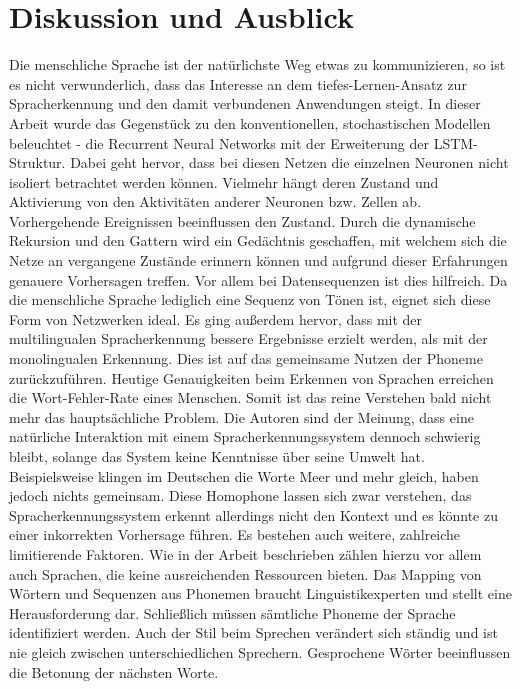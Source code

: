 \section{Diskussion und Ausblick}
Die menschliche Sprache ist der natürlichste Weg etwas zu kommunizieren, so ist es nicht verwunderlich, dass das Interesse an dem tiefes-Lernen-Ansatz zur Spracherkennung und den damit verbundenen Anwendungen steigt. In dieser Arbeit wurde das Gegenstück zu den konventionellen, stochastischen Modellen beleuchtet - die Recurrent Neural Networks mit der Erweiterung der LSTM-Struktur. Dabei geht hervor, dass bei diesen Netzen die einzelnen Neuronen nicht isoliert betrachtet werden können. Vielmehr hängt deren Zustand und Aktivierung von den Aktivitäten anderer Neuronen bzw. Zellen ab. Vorhergehende Ereignissen beeinflussen den Zustand. Durch die dynamische Rekursion und den Gattern wird ein Gedächtnis geschaffen, mit welchem sich die Netze an vergangene Zustände erinnern können und aufgrund dieser Erfahrungen genauere Vorhersagen treffen. Vor allem bei Datensequenzen ist dies hilfreich. Da die menschliche Sprache lediglich eine Sequenz von Tönen ist, eignet sich diese Form von Netzwerken ideal. Es ging außerdem hervor, dass mit der multilingualen Spracherkennung bessere Ergebnisse erzielt werden, als mit der monolingualen Erkennung. Dies ist auf das gemeinsame Nutzen der Phoneme zurückzuführen. Heutige Genauigkeiten beim Erkennen von Sprachen erreichen die Wort-Fehler-Rate eines Menschen. Somit ist das reine Verstehen bald nicht mehr das hauptsächliche Problem. Die Autoren sind der Meinung, dass eine natürliche Interaktion mit einem Spracherkennungssystem dennoch schwierig bleibt, solange das System keine Kenntnisse über seine Umwelt hat. Beispielsweise klingen im Deutschen die Worte Meer und mehr gleich, haben jedoch nichts gemeinsam. Diese Homophone lassen sich zwar verstehen, das Spracherkennungssystem erkennt allerdings nicht den Kontext und es könnte zu einer inkorrekten Vorhersage führen. Es bestehen auch weitere, zahlreiche limitierende Faktoren. Wie in der Arbeit beschrieben zählen hierzu vor allem auch Sprachen, die keine ausreichenden Ressourcen bieten. Das Mapping von Wörtern und Sequenzen aus Phonemen braucht Linguistikexperten und stellt eine Herausforderung dar. Schließlich müssen sämtliche Phoneme der Sprache identifiziert werden. Auch der Stil beim Sprechen verändert sich ständig und ist nie gleich zwischen unterschiedlichen Sprechern. Gesprochene Wörter beeinflussen die Betonung der nächsten Worte.
\\\\
